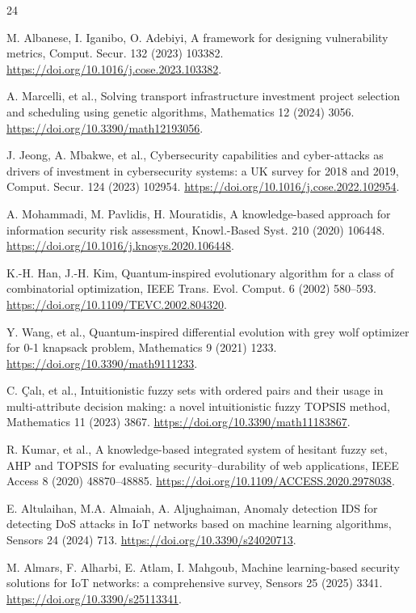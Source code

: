 \documentclass[preprint,12pt]{elsarticle}
\begin{document}
\begin{thebibliography}{24}

 M. Albanese, I. Iganibo, O. Adebiyi, A framework for designing
vulnerability metrics, Comput. Secur. 132 (2023) 103382.
\url{https://doi.org/10.1016/j.cose.2023.103382}.

 A. Marcelli, et al., Solving transport infrastructure investment
project selection and scheduling using genetic algorithms, Mathematics 12 (2024) 3056.
\url{https://doi.org/10.3390/math12193056}.

 J. Jeong, A. Mbakwe, et al., Cybersecurity capabilities and
cyber-attacks as drivers of investment in cybersecurity systems: a UK survey for 2018 and
2019, Comput. Secur. 124 (2023) 102954. \url{https://doi.org/10.1016/j.cose.2022.102954}.

 A. Mohammadi, M. Pavlidis, H. Mouratidis, A knowledge-based
approach for information security risk assessment, Knowl.-Based Syst. 210 (2020) 106448.
\url{https://doi.org/10.1016/j.knosys.2020.106448}.

 K.-H. Han, J.-H. Kim, Quantum-inspired evolutionary algorithm for a
class of combinatorial optimization, IEEE Trans. Evol. Comput. 6 (2002) 580--593.
\url{https://doi.org/10.1109/TEVC.2002.804320}.

 Y. Wang, et al., Quantum-inspired differential evolution with grey
wolf optimizer for 0-1 knapsack problem, Mathematics 9 (2021) 1233.
\url{https://doi.org/10.3390/math9111233}.

 C. \c{C}al\i, et al., Intuitionistic fuzzy sets with ordered pairs and
their usage in multi-attribute decision making: a novel intuitionistic fuzzy TOPSIS
method, Mathematics 11 (2023) 3867. \url{https://doi.org/10.3390/math11183867}.

 R. Kumar, et al., A knowledge-based integrated system of hesitant
fuzzy set, AHP and TOPSIS for evaluating security--durability of web applications, IEEE
Access 8 (2020) 48870--48885. \url{https://doi.org/10.1109/ACCESS.2020.2978038}.

 E. Altulaihan, M.A. Almaiah, A. Aljughaiman, Anomaly detection IDS
for detecting DoS attacks in IoT networks based on machine learning algorithms, Sensors
24 (2024) 713. \url{https://doi.org/10.3390/s24020713}.

 M. Almars, F. Alharbi, E. Atlam, I. Mahgoub, Machine learning-based
security solutions for IoT networks: a comprehensive survey, Sensors 25 (2025) 3341.
\url{https://doi.org/10.3390/s25113341}.


\end{thebibliography}
\end{document}
